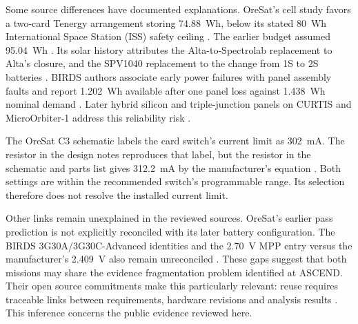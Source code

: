 Some source differences have documented explanations.
OreSat's cell study favors a two-card Tenergy arrangement storing 74.88~Wh, below its stated 80~Wh International Space Station (ISS) safety ceiling \citep{oresatbatteryresearch}.
The earlier budget assumed 95.04~Wh \citep{oresat2019powerbudget}.
Its solar history attributes the Alta-to-Spectrolab replacement to Alta's closure, and the SPV1040 replacement to the change from 1S to 2S batteries \citep{oresatsolarhistory}.
BIRDS authors associate early power failures with panel assembly faults and report 1.202~Wh available after one panel loss against 1.438~Wh nominal demand \citep{shrestha2022birds4powerperformance,shrestha2022birds4results}.
Later hybrid silicon and triple-junction panels on CURTIS and MicroOrbiter-1 address this reliability risk \citep{shrestha2026solarreliability}.

The OreSat C3 schematic labels the card switch's current limit as 302~mA. The resistor in the design notes reproduces that label, but the resistor in the schematic and parts list gives 312.2~mA by the manufacturer's equation \citep{oresatc3v5hardware,cots-mission_ti_tps259620ddat_ds}. Both settings are within the recommended switch's programmable range. Its selection therefore does not resolve the installed current limit.

Other links remain unexplained in the reviewed sources.
OreSat's earlier pass prediction is not explicitly reconciled with its later battery configuration.
The BIRDS 3G30A/3G30C-Advanced identities and the 2.70~V MPP entry versus the manufacturer's 2.409~V also remain unreconciled \citep{shrestha2022birds4powerbudget,shrestha2021birdssafety,cots-mission_azur_space_3g30a_review_legacy_ds}.
These gaps suggest that both missions may share the evidence fragmentation problem identified at ASCEND.
Their open source commitments make this particularly relevant: reuse requires traceable links between requirements, hardware revisions and analysis results \citep{kim2021birdstextbook,greenberg2021oresat}.
This inference concerns the public evidence reviewed here.
